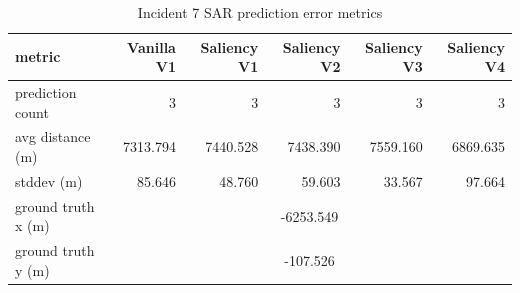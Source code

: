 \begin{table}[ht]
\centering
\caption{Incident 7 SAR prediction error metrics}
\label{tab:sar-incident-7}
\begin{tabular}{lrrrrr}
\hline
metric & Vanilla V1 & Saliency V1 & Saliency V2 & Saliency V3 & Saliency V4 \\
\hline
prediction count & 3 & 3 & 3 & 3 & 3 \\
avg distance (m) & 7313.794 & 7440.528 & 7438.390 & 7559.160 & 6869.635 \\
stddev (m) & 85.646 & 48.760 & 59.603 & 33.567 & 97.664 \\
ground truth x (m) & \multicolumn{5}{c}{-6253.549} \\
ground truth y (m) & \multicolumn{5}{c}{-107.526} \\
\hline
\end{tabular}
\end{table}
